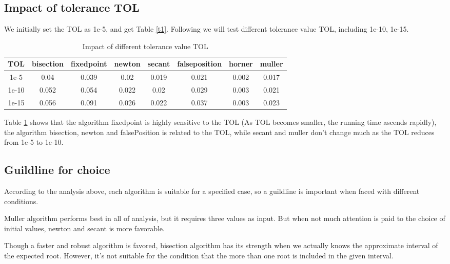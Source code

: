 \documentclass{article}
\begin{document}
    \subsection{Impact of tolerance TOL}

    We initially set the TOL as 1e-5, and get Table \ref{t1}. Following we will test different tolerance value TOL, including 1e-10, 1e-15.
    
\begin{table}[htbp]
    \centering
    \caption{Impact of different tolerance value TOL}
      \begin{tabular}{cccccccc}
      \toprule
      \toprule
      TOL   & bisection & fixedpoint & newton & secant & falseposition & horner & muller \\
      \midrule
      1e-5  & 0.04  & 0.039 & 0.02  & 0.019 & 0.021 & 0.002 & 0.017 \\
      \midrule
      1e-10 & 0.052 & 0.054 & 0.022 & 0.02 & 0.029 & 0.003 & 0.021 \\
      \midrule
      1e-15 & 0.056 & 0.091 & 0.026 & 0.022 & 0.037 & 0.003 & 0.023 \\
      \bottomrule
      \end{tabular}%
    \label{t2}%
  \end{table}%

    Table \ref{t2} shows that the algorithm fixedpoint is highly sensitive to the TOL (As TOL becomes smaller, the running time ascends rapidly), the algorithm bisection, newton and falsePosition is related to the TOL, while secant and muller don't change much as the TOL reduces from 1e-5 to 1e-10.

    \subsection{Guildline for choice}

    According to the analysis above, each algorithm is suitable for a specified case, so a guildline is important when faced with different conditions.

    Muller algorithm performs best in all of analysis, but it requires three values as input. But when not much attention is paid to the choice of initial values, newton and secant is more favorable.

    Though a faster and robust algorithm is favored, bisection algorithm has its strength when we actually knows the approximate interval of the expected root. However, it's not suitable for the condition that the more than one root is included in the given interval.
\end{document}

